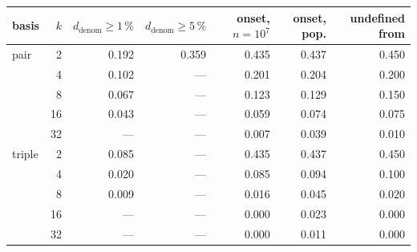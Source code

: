 \footnotesize
\begin{tabular}{lrrrrrr}
\toprule
basis & $k$ & $d_{\mathrm{denom}}\geq 1\,\%$ & $d_{\mathrm{denom}}\geq 5\,\%$ & onset, $n=10^7$ & onset, pop. & undefined from \\
\midrule
pair & 2 & 0.192 & 0.359 & 0.435 & 0.437 & 0.450 \\
 & 4 & 0.102 & --- & 0.201 & 0.204 & 0.200 \\
 & 8 & 0.067 & --- & 0.123 & 0.129 & 0.150 \\
 & 16 & 0.043 & --- & 0.059 & 0.074 & 0.075 \\
 & 32 & --- & --- & 0.007 & 0.039 & 0.010 \\
triple & 2 & 0.085 & --- & 0.435 & 0.437 & 0.450 \\
 & 4 & 0.020 & --- & 0.085 & 0.094 & 0.100 \\
 & 8 & 0.009 & --- & 0.016 & 0.045 & 0.020 \\
 & 16 & --- & --- & 0.000 & 0.023 & 0.000 \\
 & 32 & --- & --- & 0.000 & 0.011 & 0.000 \\
\bottomrule
\end{tabular}
